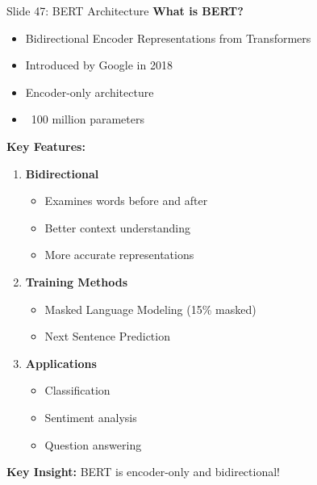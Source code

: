 \documentclass[8pt]{beamer}
\begin{document}
	\begin{frame}{Slide 47: BERT Architecture}
		\fontsize{6.5}{7.5}\selectfont
		\textbf{What is BERT?}
		\begin{itemize}
			\item Bidirectional Encoder Representations from Transformers
			\item Introduced by Google in 2018
			\item Encoder-only architecture
			\item ~100 million parameters
		\end{itemize}
		
		\vspace{0.1cm}
		\textbf{Key Features:}
		\begin{enumerate}
			\item \textbf{Bidirectional}
			\begin{itemize}
				\item Examines words before and after
				\item Better context understanding
				\item More accurate representations
			\end{itemize}
			\item \textbf{Training Methods}
			\begin{itemize}
				\item Masked Language Modeling (15\% masked)
				\item Next Sentence Prediction
			\end{itemize}
			\item \textbf{Applications}
			\begin{itemize}
				\item Classification
				\item Sentiment analysis
				\item Question answering
			\end{itemize}
		\end{enumerate}
		
		\textcolor{myblue}{\textbf{Key Insight:}} BERT is encoder-only and bidirectional!
	\end{frame}
	
\end{document}
